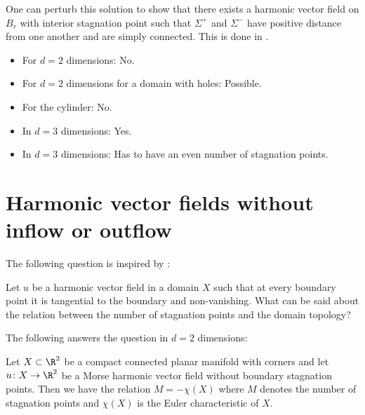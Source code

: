 \begin{frame}
  One can perturb this solution to show that there exists a harmonic vector field
  on $B_r$ with interior stagnation point such that $\Sigma^+$ and $\Sigma^-$ have positive distance
  from one another and are simply connected.
  This is done in \cite[Ex.\ 5.12]{Koppenhoefer2024}.
\end{frame}

\begin{frame}
  \questionFlowthrough
  \begin{answer}
    \begin{itemize}
      \item For $d=2$ dimensions: No.
      \item For $d=2$ dimensions for a domain with holes: Possible.
      \item For the cylinder: No.
      \item In $d=3$ dimensions: Yes.
      \item In $d=3$ dimensions: Has to have an even number of stagnation points.
    \end{itemize}
  \end{answer}
\end{frame}

\section{Harmonic vector fields without inflow or outflow}

\begin{frame}
  The following question is inspired by \cite{Lortz1970}:
  \begin{question}
    Let $u$ be a harmonic vector field in a domain $X$ such that at every boundary point it is tangential to the boundary
    and non-vanishing.
    What can be said about the relation between the number of stagnation points and the domain topology?
  \end{question}
\end{frame}

\begin{frame}
  The following answers the question in $d=2$ dimensions:
  \begin{proposition}\label{pr:n2_hvf_noInflowNoOutflow}
    Let $X\subset\R^2$ be a compact connected planar manifold with corners
    and let $u\colon X\to\R^2$ be
    a Morse harmonic vector field without boundary stagnation points.
    Then we have the relation $M=-\chi(X)$ where $M$ denotes the number of stagnation points and
    $\chi(X)$ is the Euler characteristic of $X$.
  \end{proposition}
\end{frame}

